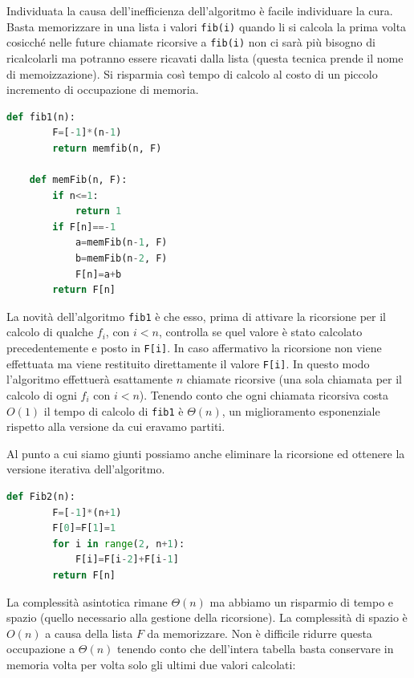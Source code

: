 Individuata la causa dell'inefficienza dell'algoritmo è facile individuare la cura. Basta memorizzare in una lista i valori \verb|fib(i)| quando li si calcola la prima volta cosicché nelle future chiamate ricorsive a \verb|fib(i)| non ci sarà più bisogno di ricalcolarli ma potranno essere ricavati dalla lista (questa tecnica prende il nome di memoizzazione). Si risparmia così tempo di calcolo al costo di un piccolo incremento di occupazione di memoria.

\begin{lstlisting}[language=Python]
    def fib1(n):
        F=[-1]*(n-1)
        return memfib(n, F)

    def memFib(n, F):
        if n<=1:
            return 1
        if F[n]==-1
            a=memFib(n-1, F)
            b=memFib(n-2, F)
            F[n]=a+b
        return F[n]
\end{lstlisting}
La novità dell'algoritmo \verb|fib1| è che esso, prima di attivare la ricorsione per il calcolo di qualche $f_i$, con $i<n$, controlla se quel valore è stato calcolato precedentemente e posto in \verb|F[i]|. In caso affermativo la ricorsione non viene effettuata ma viene restituito direttamente il valore \verb|F[i]|. In questo modo l'algoritmo effettuerà esattamente $n$ chiamate ricorsive (una sola chiamata per il calcolo di ogni $f_i$ con $i<n$). Tenendo conto che ogni chiamata ricorsiva costa $O(1)$ il tempo di calcolo di \verb|fib1| è $\Theta(n)$, un miglioramento esponenziale rispetto alla versione da cui eravamo partiti.

Al punto a cui siamo giunti possiamo anche eliminare la ricorsione ed ottenere la versione iterativa dell'algoritmo.

\begin{lstlisting}[language=Python]
    def Fib2(n):
        F=[-1]*(n+1)
        F[0]=F[1]=1
        for i in range(2, n+1):
            F[i]=F[i-2]+F[i-1]
        return F[n]
\end{lstlisting}
La complessità asintotica rimane $\Theta(n)$ ma abbiamo un risparmio di tempo e spazio (quello necessario alla gestione della ricorsione). La complessità di spazio è $O(n)$ a causa della lista $F$ da memorizzare. Non è difficile ridurre questa occupazione a $\Theta(n)$ tenendo conto che dell'intera tabella basta conservare in memoria volta per volta solo gli ultimi due valori calcolati:

